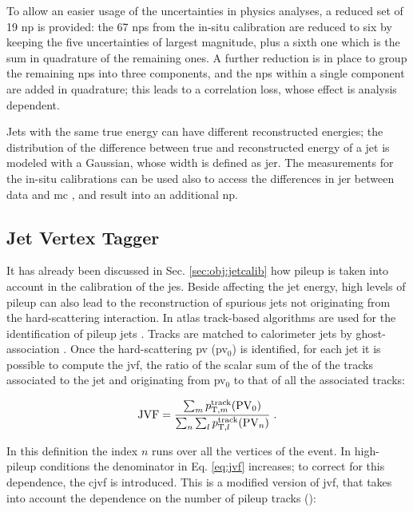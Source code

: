 To allow an easier usage of the uncertainties in physics analyses, a reduced set of 19 \gls{np} is provided: 
the 67 \glspl{np} from the in-situ calibration are reduced to six by keeping the five uncertainties of largest magnitude, 
plus a sixth one which is the sum in quadrature of the remaining ones. 
A further reduction is in place to group the remaining \glspl{np} into three components, 
and the \glspl{np} within a single component are added in quadrature; this leads to a correlation loss, whose effect is analysis dependent. 

Jets with the same true energy can have different reconstructed energies; the distribution of the difference between true and reconstructed energy of a jet is modeled with a Gaussian, whose width is defined as \gls{jer}. The measurements for the in-situ calibrations can be used also to access the differences in \gls{jer} between data and \gls{mc} \cite{TheATLAScollaboration:2015ofv,ATLAS:2015uwa}, and result into an additional \gls{np}.

\subsection{Jet Vertex Tagger}
\label{sec:jvt}

It has already been discussed in Sec. \ref{sec:obj:jetcalib} how pileup is taken into account in the calibration of the \gls{jes}. Beside affecting the jet energy, high levels of pileup can also lead to the reconstruction of spurious jets not originating from the hard-scattering interaction. In \gls{atlas} track-based algorithms are used for the identification of pileup jets \cite{Aad:2015ina,ATLAS:2014cva}. 
Tracks are matched to calorimeter jets by ghost-association \cite{Soyez:2012hv}. Once the hard-scattering \gls{pv} (\gls{pv}$_0$) is identified, 
for each jet it is possible to compute the \gls{jvf}, the ratio of the scalar sum of the \pt of the tracks associated to the jet and originating from  \gls{pv}$_0$ to that of all the associated tracks:

\begin{equation}
 {\rm JVF} = \frac{\sum_m{p_{{\rm T}, m}^{{\rm track}}({\rm PV}_0)}}{\sum_n\sum_l  p_{{\rm T}, l}^{{\rm track}}({\rm PV}_n)} \; .
 \label{eq:jvf}
\end{equation} 

\noindent In this definition the index $n$ runs over all the vertices of the event. In high-pileup conditions the denominator in 
Eq. \ref{eq:jvf} increases; to correct for this dependence, the \gls{cjvf} is introduced. 
This is a modified version of \gls{jvf}, that takes into account the dependence on the number of pileup tracks (\nPUtrk):

